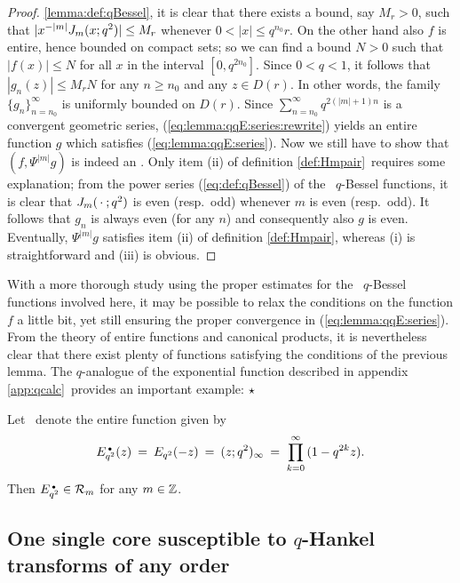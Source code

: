 \begin{proof}
\ref{lemma:def:qBessel}, it is clear that there exists a bound, say $M_r>0$,
such that $|x^{-|m|}J_{m}(x; q^2)| \leq M_r$ whenever $0 < |x| \leq q^{n_0}r$. On
the other hand also $f$ is entire, hence bounded on compact sets; so we can
find a bound $N>0$ such that $|f(x)| \leq N$ for all $x$ in the interval
$[0,q^{2n_0}]$. Since $0<q<1$, it follows that $|g_n(z)| \leq M_r N$ for any $n
\geq n_0$ and any $z\in D(r)$. In other words, the family
$\{g_n\}_{n=n_0}^\infty$ is uniformly bounded on $D(r)$. Since
$\sum_{n=n_0}^\infty q^{2(|m|+1)n}$ is a convergent geometric series,
(\ref{eq:lemma:qqE:series:rewrite}) yields an entire function $g$ which
satisfies (\ref{eq:lemma:qqE:series}). Now we still have to show that $(f,
\Psi^{|m|} g)$ is indeed an \Hmpair\@. Only item (ii) of definition
\ref{def:Hmpair}\ requires some explanation; from the power series
(\ref{eq:def:qBessel}) of the \little\ $q$-Bessel functions, it is clear that
$J_{m}(\,\cdot\:; q^2)$ is even (resp.\ odd) whenever $m$ is even (resp.\ odd). It
follows that $g_n$ is always even (for any $n$) and consequently also $g$ is
even. Eventually, $\Psi^{|m|} g$ satisfies item (ii) of definition
\ref{def:Hmpair}, whereas (i) is straight\-forward and (iii) is obvious.
\end{proof}



\begin{remark} \rm
With a more thorough study using the proper estimates for the \little\
$q$-Bessel functions involved here, it may be possible to relax the conditions
on  the function $f$ a little bit, yet still ensuring the proper convergence in
(\ref{eq:lemma:qqE:series}). From the theory of entire functions and canonical
products, it is nevertheless clear that there exist plenty of functions
satisfying the conditions of the previous lemma. The $q$-analogue of the
exponential function described in appendix \ref{app:qcalc}\ provides an
important example: $\hfill \star$
\end{remark}



\begin{cor} \label{cor:qqE_in_holS}
Let\/ \qqE\ denote the entire function given by
$$  E_{q^2}^{\scriptscriptstyle \, \bullet}(z)   \:=\:   E_{q^2}(-z)
              \:=\:   (z;q^2)_\infty
              \:=\;   \prod_{k=0}^{\infty} \, (1-q^{2k} z). $$
Then\/ $E_{q^2}^{\scriptscriptstyle \, \bullet} \in {\mathcal R}_{m}$ for any\/ $m\in \mathbb{Z}$.
\end{cor}




\subsection{One single core susceptible to $q$-Hankel transforms of any order}

